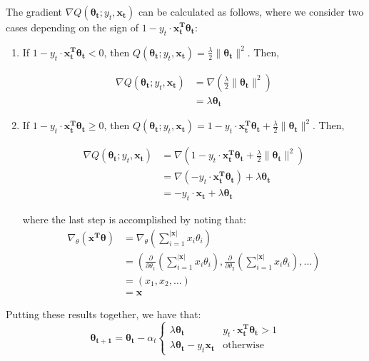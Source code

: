 \documentclass{article}
\renewcommand{\vec}[1]{\boldsymbol{#1}}
\newcommand{\pd}[2]{\frac{\partial#1}{\partial#2}}
\begin{document}
\begin{enumerate}[(a)]
The gradient $\nabla Q(\vec{\theta_{t}}; y_t, \vec{x_t})$ can be calculated as follows, where we consider two cases depending on the sign of $1-y_t\cdot\vec{x_t^{T}}\vec{\theta_t}$:

\begin{enumerate}[1.]
\item If $1-y_t\cdot\vec{x_t^{T}}\vec{\theta_t} < 0$, then $Q(\vec{\theta_{t}}; y_t, \vec{x_t}) = \frac{\lambda}{2}\|\vec{\theta_t}\|^2$. Then,

\begin{align*}
\nabla Q(\vec{\theta_{t}}; y_t, \vec{x_t}) &= \nabla\left(\frac{\lambda}{2}\|\vec{\theta_t}\|^2\right)\\
&= \lambda \vec{\theta_t}
\end{align*}

\item If $1-y_t\cdot\vec{x_t^{T}}\vec{\theta_t} \geq 0$, then $Q(\vec{\theta_{t}}; y_t, \vec{x_t}) = 1-y_t\cdot\vec{x_t^{T}}\vec{\theta_t}+\frac{\lambda}{2}\|\vec{\theta_t}\|^2$. Then,

\begin{align*}
\nabla Q(\vec{\theta_{t}}; y_t, \vec{x_t}) &= \nabla\left(1-y_t\cdot\vec{x_t^{T}}\vec{\theta_t}+\frac{\lambda}{2}\|\vec{\theta_t}\|^2\right)\\
&= \nabla\left( -y_t\cdot\vec{x_t^{T}}\vec{\theta_t} \right) + \lambda \vec{\theta_t}\\
&= -y_t\cdot\vec{x_t} + \lambda\vec{\theta_t}
\end{align*}

where the last step is accomplished by noting that:
\begin{align*}
\nabla_{\theta}\left(\vec{x^{T}}\vec{\theta}\right) &= \nabla_{\theta}\left(\sum_{i=1}^{|\vec{x}|} x_i\theta_i\right)\\
&= \left( \pd{}{\theta_1}\left(\sum_{i=1}^{|\vec{x}|} x_i\theta_i\right), \pd{}{\theta_2}\left(\sum_{i=1}^{|\vec{x}|} x_i\theta_i\right), \ldots \right)\\
&= \left( x_1, x_2, \ldots \right)\\
&= \vec{x}
\end{align*}

\end{enumerate}

Putting these results together, we have that:
\begin{equation}
\vec{\theta_{t+1}} = \vec{\theta_t} - \alpha_t \left\{ 
	\begin{array}{lr}
		\lambda\vec{\theta_t} &  y_t\cdot\vec{x_t^{T}}\vec{\theta_t} > 1\\
		\lambda\vec{\theta_t} - y_t\vec{x_t} &  \textrm{otherwise}
	\end{array}
\right.
\end{equation}


\end{enumerate}
\end{document}
